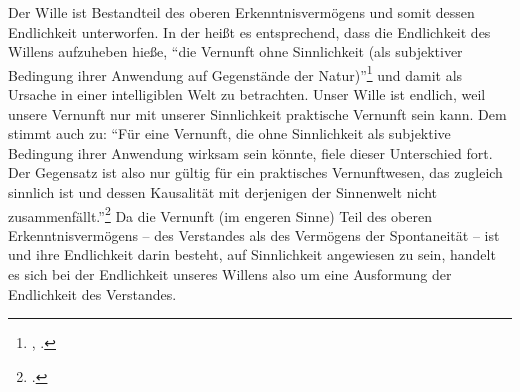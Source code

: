 \begin{comment}
Zunächst scheint unser Wille die Diskursivität des Verstandes und die
Sinnlichkeit der Anschauung gerade nicht zu teilen. Es ließe sich gar vermuten,
dass die praktische Vernunft der intellektuellen Anschauung oder dem intuitiven
Verstand entspricht, insofern sie die Gegenstände ihrer Erkenntnis -- die
ausgeführten Handlungen -- selbst hervorbringt. Nun ist -- wie
\authorfullcite{Engstrom:KantsDistinctionbetweenTheoreticalandPracticalKnowledge2002}
anführt --  auch die Erkenntnis der praktischen Vernunft eine Handlung des
\emph{diskursiven}
Verstandes.\footnote{\cite[Vgl.][\pno~59\,f.:]{Engstrom:KantsDistinctionbetweenTheoreticalandPracticalKnowledge2002}
\enquote{practical knowledge is productive of its object not only with respect to the latter's form, but even with respect to its existence. Now this description of how practical knowledge
is related to its object might appear to make practical knowledge
indistinguishable from intellectual intuition, the divine cognition with which
human discursive cognition is contrasted, and to which Kant tacitly alludes in
the passage from §14. But the distinction between these two can be duly
maintained if we bear in mind that practical knowledge, like theoretical
knowledge, is the product of discursive intellect, whose knowledge always
proceeds from concepts, or general representations, rather than from intuitions,
or singular representations, and further that, as a result, in the case of
practical knowledge, the production of the object is always the arrengement, in
accordance with a general form, of presupposed matter, whereas, in the case of
intellectual intuition, there is no matter requisite as a condition under which
the production is possible.}}
\end{comment}

Der Wille ist Bestandteil des oberen Erkenntnisvermögens und somit dessen
Endlichkeit unterworfen. In der  heißt es
entsprechend, dass die Endlichkeit des Willens aufzuheben hieße, \enquote{die Vernunft
ohne Sinnlichkeit (als subjektiver Bedingung ihrer Anwendung auf Gegenstände
der Natur)}\footnote{\cite[][\S~76]{Kant:KritikderUrteilskraft2009},
\cite[][V: 403.34--36]{Kant:GesammelteWerke1900ff.}.} und damit als Ursache in
einer intelligiblen Welt zu betrachten. Unser Wille ist endlich, weil
unsere Vernunft nur mit unserer Sinnlichkeit praktische Vernunft sein
kann. Dem stimmt auch
 zu:
\enquote{Für eine Vernunft, die ohne Sinnlichkeit als subjektive Bedingung ihrer
Anwendung wirksam sein könnte, fiele dieser Unterschied fort. Der Gegensatz
{\punkt} ist also nur gültig für ein praktisches Vernunftwesen, das zugleich
sinnlich ist und dessen Kausalität mit derjenigen der Sinnenwelt nicht
zusammenfällt.}\footnote{\cite[][151]{Foerster:Die25JahrederPhilosophie2011}.}
Da die Vernunft (im engeren Sinne) Teil des oberen Erkenntnisvermögens -- des
Verstandes als des Vermögens der Spontaneität -- ist und ihre Endlichkeit darin
besteht, auf Sinnlichkeit angewiesen zu sein, handelt es sich bei der
Endlichkeit unseres Willens also um eine Ausformung der Endlichkeit des
Verstandes.

